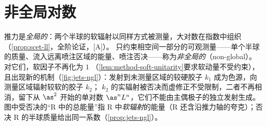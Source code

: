 \section{非全局对数}\label{sec:jets-ngl}

推力是\emph{全局的}：两个半球的软辐射以同样方式被测量，大对数在指数中组织（\cref{prop:scet-ll}，全阶论证，[A]）。
只约束相空间一部分的可观测量——单个半球的质量、流入远离喷注区域的能量、喷注否决——称为\emph{非全局的}（non-global）。对它们，软因子不再化为 $1$
（\cref{lem:method-soft-unitarity}要求软动量不受约束），且出现新的机制（\cref{fig:jets-ngl}）：发射到未测量区域的较硬胶子 $k_1$ 成为色源，向测量区域辐射较软的胶子 $k_2$；
$k_2$ 的实辐射被否决而虚修正不受限制，二者不再相消，留下从 $\as^2$ 开始的单对数 $\as^nL^n$，它们不能由主偶极子的独立发射生成\cite{DasguptaSalam2001}。
图中受否决的“R 中的总能量”指 R 中\emph{软辐射}的能量（R 还含沿推力轴的夸克）；否决 R 的半球质量给出同一系数（\cref{prop:jets-ngl}）。

